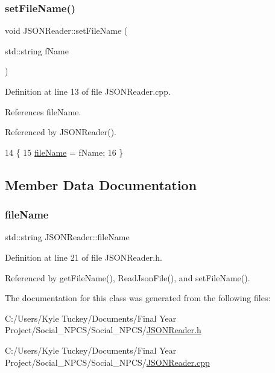 \subsubsection{\texorpdfstring{set\+File\+Name()}{setFileName()}}
{\footnotesize\ttfamily void J\+S\+O\+N\+Reader\+::set\+File\+Name (\begin{DoxyParamCaption}\item[{std\+::string}]{f\+Name }\end{DoxyParamCaption})}



Definition at line 13 of file J\+S\+O\+N\+Reader.\+cpp.



References file\+Name.



Referenced by J\+S\+O\+N\+Reader().


\begin{DoxyCode}
14 \{
15     \hyperlink{class_j_s_o_n_reader_abae0923ae887d87350b9ca1ddd56d41e}{fileName} = fName;
16 \}
\end{DoxyCode}


\subsection{Member Data Documentation}
\mbox{\label{class_j_s_o_n_reader_abae0923ae887d87350b9ca1ddd56d41e}} 
\subsubsection{\texorpdfstring{file\+Name}{fileName}}
{\footnotesize\ttfamily std\+::string J\+S\+O\+N\+Reader\+::file\+Name\hspace{0.3cm}{\ttfamily [private]}}



Definition at line 21 of file J\+S\+O\+N\+Reader.\+h.



Referenced by get\+File\+Name(), Read\+Json\+File(), and set\+File\+Name().



The documentation for this class was generated from the following files\+:\begin{DoxyCompactItemize}
\item 
C\+:/\+Users/\+Kyle Tuckey/\+Documents/\+Final Year Project/\+Social\+\_\+\+N\+P\+C\+S/\+Social\+\_\+\+N\+P\+C\+S/\hyperlink{_j_s_o_n_reader_8h}{J\+S\+O\+N\+Reader.\+h}\item 
C\+:/\+Users/\+Kyle Tuckey/\+Documents/\+Final Year Project/\+Social\+\_\+\+N\+P\+C\+S/\+Social\+\_\+\+N\+P\+C\+S/\hyperlink{_j_s_o_n_reader_8cpp}{J\+S\+O\+N\+Reader.\+cpp}\end{DoxyCompactItemize}
